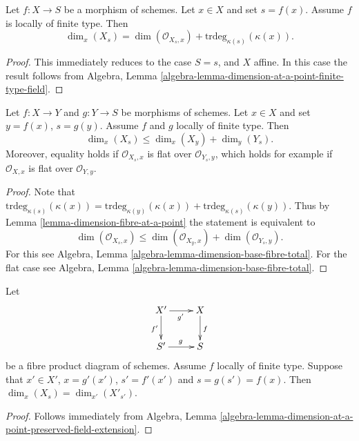 \begin{lemma}
\label{lemma-dimension-fibre-at-a-point}
Let $f : X \to S$ be a morphism of schemes.
Let $x \in X$ and set $s = f(x)$.
Assume $f$ is locally of finite type.
Then
$$
\dim_x(X_s) =
\dim(\mathcal{O}_{X_s, x}) + \text{trdeg}_{\kappa(s)}(\kappa(x)).
$$
\end{lemma}

\begin{proof}
This immediately reduces to the case $S = s$, and $X$ affine.
In this case the result follows from
Algebra, Lemma \ref{algebra-lemma-dimension-at-a-point-finite-type-field}.
\end{proof}

\begin{lemma}
\label{lemma-dimension-fibre-at-a-point-additive}
Let $f : X \to Y$ and $g : Y \to S$ be morphisms of schemes.
Let $x \in X$ and set $y = f(x)$, $s = g(y)$.
Assume $f$ and $g$ locally of finite type.
Then
$$
\dim_x(X_s) \leq \dim_x(X_y) + \dim_y(Y_s).
$$
Moreover, equality holds if $\mathcal{O}_{X_s, x}$ is flat
over $\mathcal{O}_{Y_s, y}$, which holds for example if $\mathcal{O}_{X, x}$
is flat over $\mathcal{O}_{Y, y}$.
\end{lemma}

\begin{proof}
Note that $\text{trdeg}_{\kappa(s)}(\kappa(x)) =
\text{trdeg}_{\kappa(y)}(\kappa(x)) + \text{trdeg}_{\kappa(s)}(\kappa(y))$.
Thus by Lemma \ref{lemma-dimension-fibre-at-a-point} the statement
is equivalent to
$$
\dim(\mathcal{O}_{X_s, x})
\leq
\dim(\mathcal{O}_{X_y, x}) + \dim(\mathcal{O}_{Y_s, y}).
$$
For this see Algebra, Lemma \ref{algebra-lemma-dimension-base-fibre-total}.
For the flat case see
Algebra, Lemma \ref{algebra-lemma-dimension-base-fibre-total}.
\end{proof}


\begin{lemma}
\label{lemma-dimension-fibre-after-base-change}
Let
$$
\xymatrix{
X' \ar[r]_{g'} \ar[d]_{f'} & X \ar[d]^f \\
S' \ar[r]^g & S
}
$$
be a fibre product diagram of schemes. Assume $f$ locally of finite type.
Suppose that $x' \in X'$, $x = g'(x')$, $s' = f'(x')$ and
$s = g(s') = f(x)$. Then $\dim_x(X_s) = \dim_{x'}(X'_{s'})$.
\end{lemma}

\begin{proof}
Follows immediately from
Algebra,
Lemma \ref{algebra-lemma-dimension-at-a-point-preserved-field-extension}.
\end{proof}

